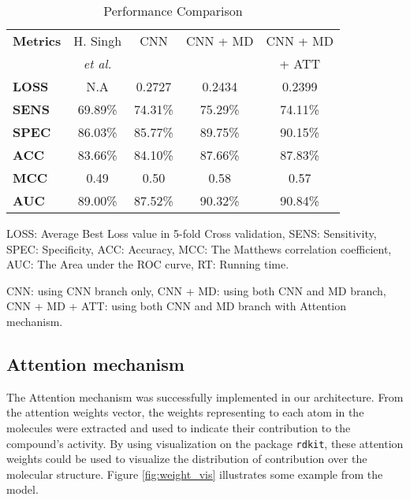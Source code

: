 \documentclass[conference]{IEEEtran}
\begin{document}
{{\begin{table}[htbp]    
    \centering    
    \begin{threeparttable}
        \caption{Performance Comparison }
        \label{tab:perform}
        \centering    
        \begin{tabular}{lcccc}
        \hline
        \textbf{Metrics} \tnote{\textdagger}
                        & H. Singh  & CNN   & CNN + MD & CNN + MD \\
                        &\textit{et al.}    &   &   & + ATT \tnote{\textdaggerdbl}  \\
        \hline
        \textbf{LOSS}   & N.A                      & 0.2727  & 0.2434   & 0.2399   \\
        \textbf{SENS}   & 69.89\%                  & 74.31\% & 75.29\%  & 74.11\%   \\
        \textbf{SPEC}   & 86.03\%                  & 85.77\% & 89.75\%  & 90.15\%   \\
        \textbf{ACC}    & 83.66\%                  & 84.10\% & 87.66\%  & 87.83\%   \\
\textbf{MCC}    & 0.49                  & 0.50  & 0.58  & 0.57  \\
        \textbf{AUC}    & 89.00\%                  & 87.52\%  & 90.32\%  & 90.84\%  \\
\hline      
        \end{tabular}
        \begin{tablenotes}
            \footnotesize
            \item[\textdagger] LOSS: Average Best Loss value in 5-fold Cross validation, SENS: Sensitivity, SPEC: Specificity, ACC: Accuracy, MCC: The Matthews correlation coefficient, AUC: The Area under the ROC curve, RT: Running time.
            \item[\textdaggerdbl] CNN: using CNN branch only, CNN + MD: using both CNN and MD branch, CNN + MD + ATT: using both CNN and MD branch with Attention mechanism.
        \end{tablenotes}
    \end{threeparttable}
\end{table}





\subsection{Attention mechanism}\label{subsec:res_att}
The Attention mechanism was successfully implemented in our architecture. From the attention weights vector, the weights representing to each atom in the molecules were extracted and used to indicate their contribution to the compound's activity. By using visualization on the package \texttt{rdkit}, these attention weights could be used to visualize the distribution of contribution over the molecular structure. Figure \ref{fig:weight_vis} illustrates some example from the model.

}}
\end{document}
